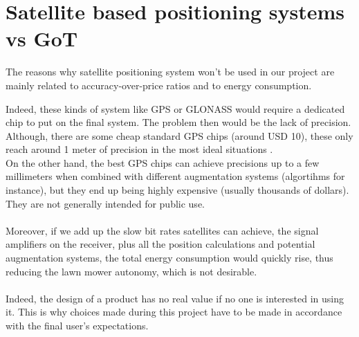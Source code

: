 \section{Satellite based positioning systems vs GoT}
The reasons why satellite positioning system won't be used in our project are mainly related to accuracy-over-price ratios and to energy consumption.

\noindent
Indeed, these kinds of system like GPS or GLONASS would require a dedicated chip to put on the final system. The problem then would be the lack of precision. Although, there are some cheap standard GPS chips (around USD 10), these only reach around 1 meter of precision in the most ideal situations \cite{GPSUSWebsiteAccuracy,Miller}. \\
On the other hand, the best GPS chips can achieve precisions up to a few millimeters \cite{GPSUSWebsiteAccuracy} when combined with different augmentation systems (algortihms for instance), but they end up being highly expensive (usually thousands of dollars). They are not generally intended for public use.
 \\\\
\noindent
Moreover, if we add up the slow bit rates satellites can achieve, the signal amplifiers on the receiver, plus all the position calculations and potential augmentation systems, the total energy consumption would quickly rise,  thus reducing the lawn mower autonomy, which is not desirable.\\\\
\noindent
Indeed, the design of a product has no real value if no one is interested in using it. This is why choices made during this project have to be made in accordance with the final user's expectations.\\\\

\nopagebreak